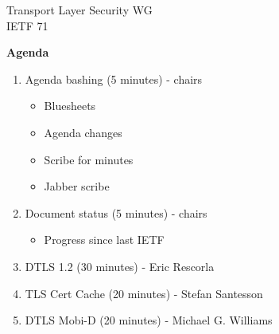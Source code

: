 \documentclass[helvetica]{seminar}
\newcommand{\heading}[1]{%
  \begin{center} 
    \large\bf 
    #1 
  \end{center} 
  \vspace{.4 in}}
\begin{document}
\begin{slide}
\begin{center}
\vspace{1 in}
\LARGE{{\bf}Transport Layer Security WG}\\
\large{{IETF 71}} \\
\end{center}
\end{slide}


\centerslidesfalse 

\begin{slide}
\heading{Agenda}

{\tiny
\begin{enumerate}
\item Agenda bashing (5 minutes) - chairs
\begin{itemize}
\item Bluesheets
\item Agenda changes
\item Scribe for minutes
\item Jabber scribe
\end{itemize}
\item Document status (5 minutes) - chairs
\begin{itemize}
\item Progress since last IETF
\end{itemize}      
\item  DTLS 1.2 (30 minutes) - Eric Rescorla
\item  TLS Cert Cache (20 minutes) - Stefan Santesson
\item  DTLS Mobi-D (20 minutes) - Michael G. Williams
\end{enumerate}
}

\end{slide}
\end{document}
